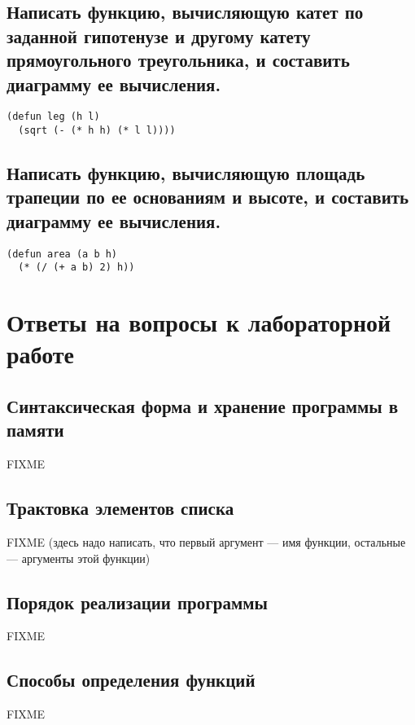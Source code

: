 \clearpage

\section{Написать функцию, вычисляющую катет по заданной гипотенузе и другому катету прямоугольного треугольника, и составить диаграмму ее вычисления.}

\begin{lstlisting}
(defun leg (h l)
  (sqrt (- (* h h) (* l l))))
\end{lstlisting}

\vspace{60mm}

\section{Написать функцию, вычисляющую площадь трапеции по ее основаниям и высоте, и составить диаграмму ее вычисления.}

\begin{lstlisting}
(defun area (a b h) 
  (* (/ (+ a b) 2) h))
\end{lstlisting}

\chapter{Ответы на вопросы к лабораторной работе}

\section{Синтаксическая форма и хранение программы в памяти}

FIXME

\section{Трактовка элементов списка}

FIXME (здесь надо написать, что первый аргумент --- имя функции, остальные --- аргументы этой функции)

\section{Порядок реализации программы}

FIXME

\section{Способы определения функций}

FIXME

